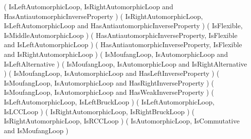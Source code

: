 ( IsLeftAutomorphicLoop, IsRightAutomorphicLoop and HasAntiautomorphicInverseProperty )
( IsRightAutomorphicLoop, IsLeftAutomorphicLoop and HasAntiautomorphicInverseProperty )
( IsFlexible, IsMiddleAutomorphicLoop )
( HasAntiautomorphicInverseProperty, IsFlexible and IsLeftAutomorphicLoop )
( HasAntiautomorphicInverseProperty, IsFlexible and IsRightAutomorphicLoop )
( IsMoufangLoop, IsAutomorphicLoop and IsLeftAlternative )
( IsMoufangLoop, IsAutomorphicLoop and IsRightAlternative )
( IsMoufangLoop, IsAutomorphicLoop and HasLeftInverseProperty )
( IsMoufangLoop, IsAutomorphicLoop and HasRightInverseProperty )
( IsMoufangLoop, IsAutomorphicLoop and HasWeakInverseProperty )
( IsLeftAutomorphicLoop, IsLeftBruckLoop )
( IsLeftAutomorphicLoop, IsLCCLoop )
( IsRightAutomorphicLoop, IsRightBruckLoop )
( IsRightAutomorphicLoop, IsRCCLoop )
( IsAutomorphicLoop, IsCommutative and IsMoufangLoop )
\endtt
